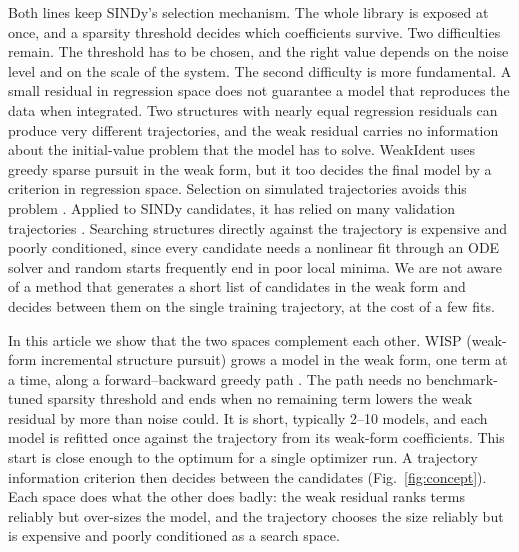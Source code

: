 \documentclass[10pt]{article}
\newcommand{\pv}[1]{\textcolor{prelim}{#1}}
\newcommand{\pv}[1]{#1}
\begin{document}
Both lines keep SINDy's selection mechanism. The whole library is exposed at once, and a sparsity threshold decides
which coefficients survive. Two difficulties remain. The threshold has to be chosen, and the right value depends on the
noise level and on the scale of the system. The second difficulty is more fundamental. A small residual in regression
space does not guarantee a model that reproduces the data when integrated. Two structures with nearly equal regression
residuals can produce very different trajectories, and the weak residual carries no information about the
initial-value problem that the model has to solve. WeakIdent \cite{tang2023} uses greedy sparse pursuit in the weak form, but it
too decides the final model by a criterion in regression space. Selection on simulated trajectories avoids
this problem \cite{mangan2017,piroddi2003}. Applied to SINDy candidates, it has relied on many validation trajectories
\cite{mangan2017}. Searching structures directly against the trajectory is expensive and poorly conditioned, since
every candidate needs a nonlinear fit through an ODE solver and random starts frequently end in poor local minima. We
are not aware of a method that generates a short list of candidates in the weak form and decides between them on the
single training trajectory, at the cost of a few fits.

In this article we show that the two spaces complement each other. WISP (weak-form incremental structure pursuit)
grows a model in the weak form, one term at a time, along a forward--backward greedy path
\cite{billings1989,zhang2011}. The path needs no benchmark-tuned sparsity threshold and ends when no remaining term
lowers the weak residual by more than noise could. It is short, typically \pv{2--10} models, and each model is refitted
once against the trajectory from its weak-form coefficients. This start is close enough to the optimum for a single
optimizer run. A trajectory information criterion \cite{schwarz1978} then decides between the candidates
(Fig.~\ref{fig:concept}). Each space does what the other does badly: the weak residual ranks terms reliably but
over-sizes the model, and the trajectory chooses the size reliably but is expensive and poorly conditioned as a search
space.
\end{document}
